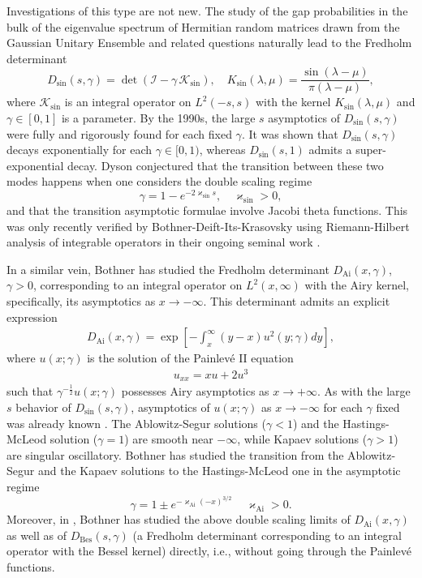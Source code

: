 \documentclass[a4paper,10pt,leqno]{amsart}
\numberwithin{equation}{subsection}
\theoremstyle{plain}
\theoremstyle{definition}
\theoremstyle{remark}
\theoremstyle{case}
\begin{document}
Investigations of this type are not new. The study of the gap probabilities in the bulk of the eigenvalue spectrum of Hermitian random matrices drawn from the Gaussian Unitary Ensemble and related questions naturally lead to the Fredholm determinant 
\[
D_{\sin}(s, \gamma) = \det \left( \mathcal I - \gamma \, \mathcal{K}_{\sin} \right), \quad K_{\sin} (\lambda, \mu) = \frac{\sin (\lambda - \mu)}{\pi (\lambda - \mu)},
\]
where \( \mathcal{K}_{\sin} \) is an integral operator on $L^2(-s,s)$ with the kernel \( K_{\sin} (\lambda, \mu) \) and \( \gamma \in [0, 1] \) is a parameter. By the 1990s, the large $s$ asymptotics of \( D_{\sin}(s, \gamma) \) were fully and rigorously found for each fixed $\gamma$. It was shown that $D_{\sin}(s, \gamma)$ decays exponentially for each $\gamma \in [0, 1)$, whereas $D_{\sin}(s, 1)$ admits a super-exponential decay. Dyson conjectured that the transition between these two modes happens when one considers the double scaling regime
\[
\gamma = 1 - e^{-2\varkappa_{\sin} s}, \quad \varkappa_{\sin}>0,
\]
and that the transition asymptotic formulae involve Jacobi theta functions. This was only recently verified by Bothner-Deift-Its-Krasovsky using Riemann-Hilbert analysis of integrable operators in their ongoing seminal work \cite{BDIK1, BDIK2, BDIK3, BDIK4}.

In a similar vein, Bothner \cite{Bothner17} has studied the Fredholm determinant \( D_{\mathrm{Ai}}(x, \gamma) \), \( \gamma>0 \), corresponding to an integral operator on \( L^2(x,\infty) \) with the Airy kernel, specifically, its asymptotics as \( x\to-\infty \). This determinant admits an explicit expression
\begin{align}
D_{\mathrm{Ai}}(x, \gamma) = \exp \left[ - \int_x^\infty (y-x) u^2(y; \gamma) dy \right],
\end{align}
where \( u(x; \gamma) \) is the solution of the Painlev\'e II equation
\begin{align}
u_{xx} = x u + 2u^3
\end{align}
such that \( \gamma^{-\frac12}u(x; \gamma) \) possesses Airy asymptotics as \( x\to+\infty\). As with the large $s$ behavior of $D_{\sin}(s, \gamma)$, asymptotics of \( u(x; \gamma) \) as \( x\to-\infty \) for each \( \gamma \) fixed was already known \cite{AblowitzSegur77,AblowitzSegur81,HatingsMcLeod,Kapaev92}. The  Ablowitz-Segur solutions ($\gamma < 1$) and the Hastings-McLeod solution ($\gamma = 1$) are smooth near $-\infty$, while Kapaev solutions ($\gamma > 1$) are singular oscillatory. Bothner has studied the transition from the Ablowitz-Segur and the Kapaev solutions to the Hastings-McLeod one in the asymptotic regime
\[
\gamma = 1 \pm e^{-\varkappa_\mathrm{Ai}(-x)^{3/2}}\, \quad \varkappa_\mathrm{Ai}>0.
\]
Moreover, in \cite{Bothnergap}, Bothner has studied the above double scaling limits of \( D_{\mathrm{Ai}}(x, \gamma) \) as well as of \( D_{\mathrm{Bes}}(s, \gamma) \) (a Fredholm determinant corresponding to an integral operator with the Bessel kernel) directly, i.e., without going through the Painlev\'e functions.
\end{document}
